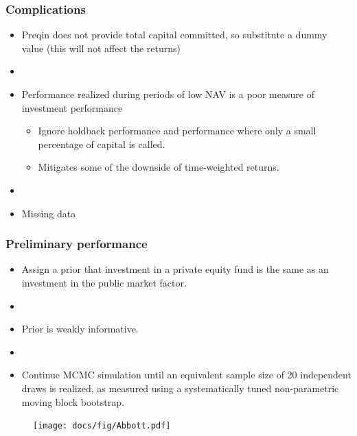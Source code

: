 \documentclass[10pt, compress]{beamer}
\begin{document}
\begin{frame}[fragile]
\frametitle{Complications} \label{fr:motivation}
\begin{itemize}
    \item Preqin does not provide  total capital committed, so substitute a dummy value (this will not affect the returns)
    \item []
    \item Performance realized during periods of low NAV is a poor measure of investment performance
    \begin{itemize}
        \item Ignore holdback performance and performance where only a small percentage of capital is called.
        \item Mitigates some of the downside of time-weighted returns.
    \end{itemize}
    \item []
    \item Missing data
\end{itemize}
\end{frame}


\begin{frame}[fragile]
\frametitle{Preliminary performance} \label{fr:motivation}
\begin{itemize}
    \item Assign a prior that investment in a private equity fund is the same as an investment in the public market factor.
    \item []
    \item Prior is weakly informative.
    \item []
    \item Continue MCMC simulation until an equivalent sample size of 20 independent draws is realized, as measured using a systematically tuned non-parametric moving block bootstrap.
\end{itemize}
\end{frame}


\begin{frame}[fragile]

\begin{figure}
	\centering
	\texttt{[image: docs/fig/Abbott.pdf]}\\
    \bigskip

\end{figure}
\end{frame}
\end{document}
